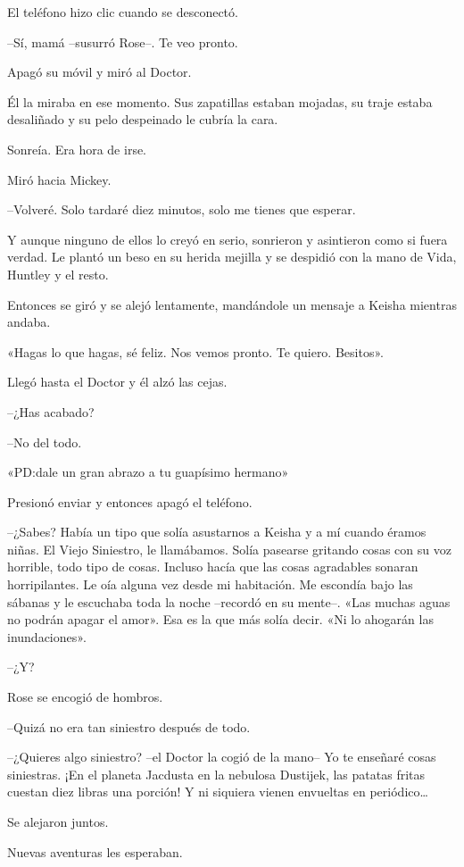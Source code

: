 {El teléfono hizo clic cuando se desconectó.}

{--Sí, mamá --susurró Rose--. Te veo pronto.}

{Apagó su móvil y miró al Doctor.}

{Él la miraba en ese momento. Sus zapatillas estaban mojadas, su traje
estaba desaliñado y su pelo despeinado le cubría la cara.}

{Sonreía. Era hora de irse.}

{Miró hacia Mickey.}

{--Volveré. Solo tardaré diez minutos, solo me tienes que esperar.}

{Y aunque ninguno de ellos lo creyó en serio, sonrieron y asintieron
 como si fuera verdad. Le plantó un beso en su herida mejilla y se
despidió con la mano de Vida, Huntley y el resto.}

{Entonces se giró y se alejó lentamente, mandándole un mensaje a Keisha
mientras andaba.}

{«Hagas lo que hagas, sé feliz. Nos vemos pronto. Te quiero. Besitos».}

{Llegó hasta el Doctor y él alzó las cejas.}

{--¿Has acabado?}

{--No del todo.}

{«PD:\@ dale un gran abrazo a tu guapísimo hermano»}

{Presionó enviar y entonces apagó el teléfono.}

{--¿Sabes? Había un tipo que solía asustarnos a Keisha y a mí cuando
 éramos niñas. El Viejo Siniestro, le llamábamos. Solía pasearse gritando
 cosas con su voz horrible, todo tipo de cosas. Incluso hacía que las
 cosas agradables sonaran horripilantes. Le oía alguna vez desde mi
 habitación. Me escondía bajo las sábanas y le escuchaba toda la noche
 --recordó en su mente--. «Las muchas aguas no podrán apagar el amor».
Esa es la que más solía decir. «Ni lo ahogarán las inundaciones».}

{--¿Y?}

{Rose se encogió de hombros.}

{--Quizá no era tan siniestro después de todo.}

{--¿Quieres algo siniestro? --el Doctor la cogió de la mano-- Yo te
 enseñaré cosas siniestras. ¡En el planeta Jacdusta en la nebulosa
 Dustijek, las patatas fritas cuestan diez libras una porción! Y ni
 siquiera vienen envueltas en periódico\ldots{}}

{Se alejaron juntos.}

{Nuevas aventuras les esperaban.}

\mbox{}
